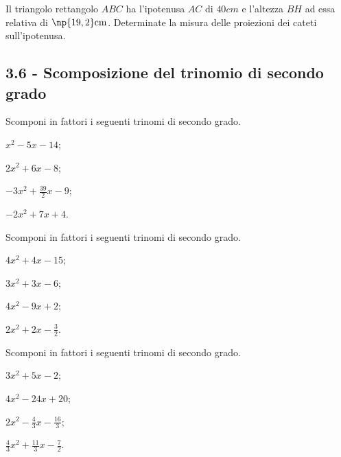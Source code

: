 \begin{esercizio}
 \label{ese:3.83}
Il triangolo rettangolo $ABC$ ha l'ipotenusa $AC$ di $40\unit{cm}$ e l'altezza $BH$ ad essa relativa di $\np{19,2}\unit{cm}$. Determinate la misura delle proiezioni dei cateti sull'ipotenusa.
\end{esercizio}

\subsection*{3.6 - Scomposizione del trinomio di secondo grado}


\begin{esercizio}[\Ast]
 \label{ese:3.84}
Scomponi in fattori i seguenti trinomi di secondo grado.
\begin{multicols}{2}
\begin{enumeratea}
\item $x^{2}-5 x-14$;
\item $2 x^{2} + 6 x-8$;
\item $- 3 x^{2} + \frac{39}{2} x-9$;
\item $- 2 x^{2} + 7 x + 4$.
\end{enumeratea}
\end{multicols}
\end{esercizio}

\begin{esercizio}[\Ast]
 \label{ese:3.85}
Scomponi in fattori i seguenti trinomi di secondo grado.
\begin{multicols}{2}
\begin{enumeratea}
\item $4 x^{2} + 4 x-15$;
\item $3 x^{2} + 3 x-6$;
\item $4 x^{2}-9 x + 2$;
\item $2 x^{2} + 2 x - \frac{3}{2}$.
\end{enumeratea}
\end{multicols}
\end{esercizio}

\begin{esercizio}[\Ast]
 \label{ese:3.86}
Scomponi in fattori i seguenti trinomi di secondo grado.
\begin{multicols}{2}
\begin{enumeratea}
\item $3 x^{2} + 5 x - 2$;
\item $4 x^{2}-24 x + 20$;
\item $2 x^{2}-\frac{4}{3} x - \frac{16}{3}$;
\item $\frac{4}{3} x^{2} + \frac{11}{3} x - \frac{7}{2}$.
\end{enumeratea}
\end{multicols}
\end{esercizio}

